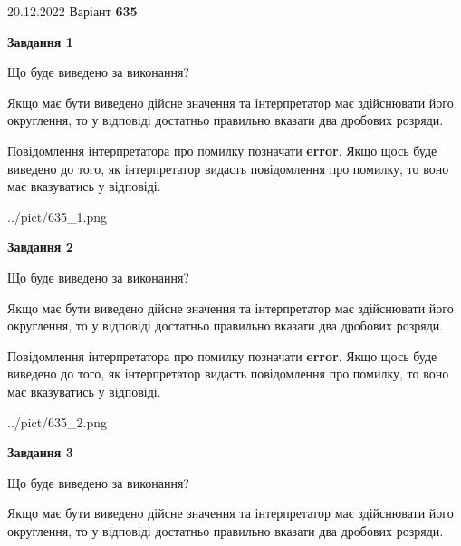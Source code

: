 \documentclass[12pt, ukrainian]{article}
\begin{document}
{20.12.2022 Варіант \No \textbf { 635 }\par}
{
\begin {Large}

{\begin {center}\textbf{Завдання 1}\end {center}}\par
Що буде виведено за виконання? \par

Якщо має бути виведено дійсне значення та інтерпретатор має здійснювати його округлення, 
то у відповіді достатньо правильно вказати два дробових розряди.

Повідомлення інтерпретатора про помилку позначати \textbf{error}.
Якщо щось буде виведено до того, як інтерпретатор видасть повідомлення про помилку, 
то воно має вказуватись у відповіді. \par

\begin{center}
	{../pict/635_1.png}
\end{center}
\newpage

{\begin {center}\textbf{Завдання 2}\end {center}}\par
Що буде виведено за виконання? \par

Якщо має бути виведено дійсне значення та інтерпретатор має здійснювати його округлення, 
то у відповіді достатньо правильно вказати два дробових розряди.

Повідомлення інтерпретатора про помилку позначати \textbf{error}.
Якщо щось буде виведено до того, як інтерпретатор видасть повідомлення про помилку, 
то воно має вказуватись у відповіді. \par

\begin{center}
	{../pict/635_2.png}
\end{center}
\newpage

{\begin {center}\textbf{Завдання 3}\end {center}}\par
Що буде виведено за виконання? \par

Якщо має бути виведено дійсне значення та інтерпретатор має здійснювати його округлення, 
то у відповіді достатньо правильно вказати два дробових розряди.


\end{Large}}
\end{document}
